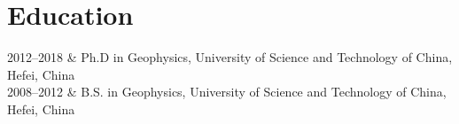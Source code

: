 \section{Education}

\begin{EntriesTable}{0.18}{0.02}{0.80}
2012--2018 & Ph.D in Geophysics, University of Science and Technology of China, Hefei, China \\
2008--2012 & B.S. in Geophysics, University of Science and Technology of China, Hefei, China
\end{EntriesTable}
